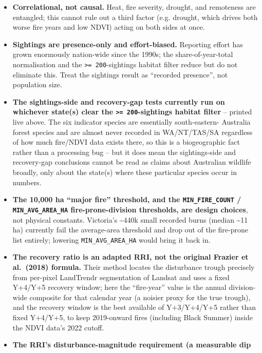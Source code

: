 \documentclass[
  letterpaper,
  DIV=11,
  numbers=noendperiod]{scrartcl}
\providecommand{\tightlist}{%
  \setlength{\itemsep}{0pt}\setlength{\parskip}{0pt}}
\begin{document}
\begin{itemize}
\tightlist
\item
  \textbf{Correlational, not causal.} Heat, fire severity, drought, and
  remoteness are entangled; this cannot rule out a third factor (e.g.
  drought, which drives both worse fire years and low NDVI) acting on
  both sides at once.
\item
  \textbf{Sightings are presence-only and effort-biased.} Reporting
  effort has grown enormously nation-wide since the 1990s; the
  share-of-year-total normalisation and the
  \texttt{\textgreater{}=\ 200}-sightings habitat filter reduce but do
  not eliminate this. Treat the sightings result as ``recorded
  presence'', not population size.
\item
  \textbf{The sightings-side and recovery-gap tests currently run on
  whichever state(s) clear the \texttt{\textgreater{}=\ 200}-sightings
  habitat filter} -- printed live above. The six indicator species are
  essentially south-eastern- Australia forest species and are almost
  never recorded in WA/NT/TAS/SA regardless of how much fire/NDVI data
  exists there, so this is a biogeographic fact rather than a processing
  bug -- but it does mean the sightings-side and recovery-gap
  conclusions cannot be read as claims about Australian wildlife
  broadly, only about the state(s) where these particular species occur
  in numbers.
\item
  \textbf{The 10,000 ha ``major fire'' threshold, and the
  \texttt{MIN\_FIRE\_COUNT} / \texttt{MIN\_AVG\_AREA\_HA}
  fire-prone-division thresholds, are design choices}, not physical
  constants. Victoria's \textasciitilde440k small recorded burns (median
  \textasciitilde11 ha) currently fail the average-area threshold and
  drop out of the fire-prone list entirely; lowering
  \texttt{MIN\_AVG\_AREA\_HA} would bring it back in.
\item
  \textbf{The recovery ratio is an adapted RRI, not the original Frazier
  et al.~(2018) formula.} Their method locates the disturbance trough
  precisely from per-pixel LandTrendr segmentation of Landsat and uses a
  fixed Y+4/Y+5 recovery window; here the ``fire-year'' value is the
  annual division-wide composite for that calendar year (a noisier proxy
  for the true trough), and the recovery window is the best available of
  Y+3/Y+4/Y+5 rather than fixed Y+4/Y+5, to keep 2019-onward fires
  (including Black Summer) inside the NDVI data's 2022 cutoff.
\item
  \textbf{The RRI's disturbance-magnitude requirement (a measurable dip
}
\end{itemize}
\end{document}
